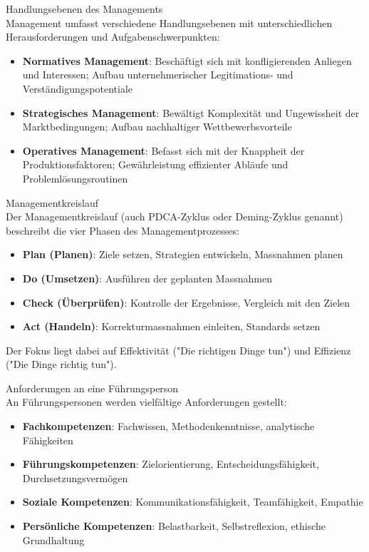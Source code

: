 \begin{concept}{Handlungsebenen des Managements}\\
Management umfasst verschiedene Handlungsebenen mit unterschiedlichen Herausforderungen und Aufgabenschwerpunkten:
\begin{itemize}
    \item \textbf{Normatives Management}: Beschäftigt sich mit konfligierenden Anliegen und Interessen; Aufbau unternehmerischer Legitimations- und Verständigungspotentiale
    \item \textbf{Strategisches Management}: Bewältigt Komplexität und Ungewissheit der Marktbedingungen; Aufbau nachhaltiger Wettbewerbsvorteile
    \item \textbf{Operatives Management}: Befasst sich mit der Knappheit der Produktionsfaktoren; Gewährleistung effizienter Abläufe und Problemlösungsroutinen
\end{itemize}
\end{concept}

\begin{concept}{Managementkreislauf}\\
Der Managementkreislauf (auch PDCA-Zyklus oder Deming-Zyklus genannt) beschreibt die vier Phasen des Managementprozesses:
\begin{itemize}
    \item \textbf{Plan (Planen)}: Ziele setzen, Strategien entwickeln, Massnahmen planen
    \item \textbf{Do (Umsetzen)}: Ausführen der geplanten Massnahmen
    \item \textbf{Check (Überprüfen)}: Kontrolle der Ergebnisse, Vergleich mit den Zielen
    \item \textbf{Act (Handeln)}: Korrekturmassnahmen einleiten, Standards setzen
\end{itemize}

Der Fokus liegt dabei auf Effektivität ("Die richtigen Dinge tun") und Effizienz ("Die Dinge richtig tun").
\end{concept}

\begin{definition}{Anforderungen an eine Führungsperson}\\
An Führungspersonen werden vielfältige Anforderungen gestellt:
\begin{itemize}
    \item \textbf{Fachkompetenzen}: Fachwissen, Methodenkenntnisse, analytische Fähigkeiten
    \item \textbf{Führungskompetenzen}: Zielorientierung, Entscheidungsfähigkeit, Durchsetzungsvermögen
    \item \textbf{Soziale Kompetenzen}: Kommunikationsfähigkeit, Teamfähigkeit, Empathie
    \item \textbf{Persönliche Kompetenzen}: Belastbarkeit, Selbstreflexion, ethische Grundhaltung
\end{itemize}
\end{definition}

